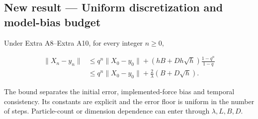 \documentclass[11pt,a4paper]{report}
\begin{document}
\subsection{\texorpdfstring{New result — Uniform discretization and model-bias budget}{New result — Uniform discretization and model-bias budget}}



Under Extra A8–Extra A10, for every integer \(n\ge0\),



\[\begin{aligned}\|X_n-y_n\|&\le q^n\|X_0-y_0\|+(hB+Dh\sqrt h)\frac{1-q^n}{1-q}\\&\le q^n\|X_0-y_0\|+\frac2\lambda(B+D\sqrt h).\end{aligned}\]



The bound separates the initial error, implemented-force bias and temporal consistency. Its constants are explicit and the error floor is uniform in the number of steps. Particle-count or dimension dependence can enter through \(\lambda,L,B,D\).
\end{document}
